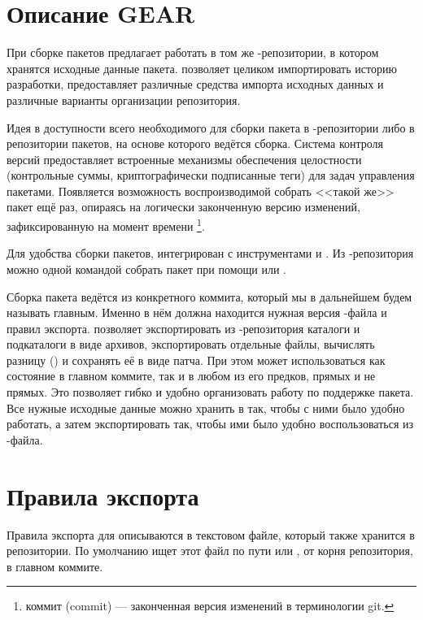 \section{Описание GEAR}
При сборке пакетов  предлагает работать в том же -репозитории,
в котором хранятся исходные данные пакета.  позволяет целиком импортировать
историю разработки, предоставляет различные средства импорта исходных данных и
различные варианты организации репозитория.

Идея  в доступности всего необходимого для сборки пакета в -репозитории
либо в репозитории пакетов, на основе которого ведётся сборка. Система контроля версий
 предоставляет встроенные механизмы обеспечения целостности (контрольные суммы,
криптографически подписанные теги) для задач управления пакетами. Появляется возможность
воспроизводимой собрать <<такой же>> пакет ещё раз, опираясь на логически
законченную версию изменений, зафиксированную на момент времени%
\footnote{коммит (commit) --- законченная версия изменений в терминологии git.}.

Для удобства сборки пакетов,  интегрирован с инструментами  и
. Из -репозитория можно одной командой собрать пакет при помощи
 или .

Сборка пакета ведётся из конкретного коммита, который мы в дальнейшем будем называть главным.
Именно в нём должна находится нужная версия -файла и правил экспорта. 
позволяет экспортировать из -репозитория каталоги и подкаталоги в виде архивов,
экспортировать отдельные файлы, вычислять разницу () и сохранять её в виде патча.
При этом может использоваться как состояние в главном коммите, так и в любом из его предков,
прямых и не прямых. Это позволяет гибко и удобно организовать работу по поддержке пакета.
Все нужные исходные данные можно хранить в  так, чтобы с ними было удобно работать,
а затем экспортировать так, чтобы ими было удобно воспользоваться из -файла.

\section{Правила экспорта}

Правила экспорта для  описываются в текстовом файле, который также хранится в репозитории.
По умолчанию  ищет этот файл по пути  или , от корня репозитория,
в главном коммите.

